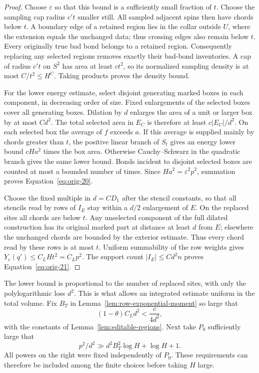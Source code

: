 \begin{proof}
Choose $\varepsilon$ so that this bound is a sufficiently small
fraction of $t$. Choose the sampling cap radius $c't$ smaller still.
All sampled adjacent spins then have chords below $t$. A boundary
edge of a retained region lies in the collar outside $U$, where the
extension equals the unchanged data; thus crossing edges also remain
below $t$. Every originally true bad bond belongs to a retained
region. Consequently replacing any selected regions removes exactly
their bad-bond inventories. A cap of radius $c't$ on $S^2$ has area
at least $ct^2$, so its normalized sampling density is at most
$C/t^2\le H^C$. Taking products proves the density bound.

For the lower energy estimate, select disjoint generating marked
boxes in each component, in decreasing order of size. Fixed
enlargements of the selected boxes cover all generating boxes.
Dilation by $d$ enlarges the area of a unit or larger box by at most
$Cd^2$. The total selected area in $E_C$ is therefore at least
$c|E_C|/d^2$. On each selected box the average of $f$ exceeds $a$.
If this average is supplied mainly by chords greater than $t$, the
positive linear branch of $S_t$ gives an energy lower bound
$cHa^2$ times the box area. Otherwise Cauchy--Schwarz in the quadratic
branch gives the same lower bound. Bonds incident to disjoint selected
boxes are counted at most a bounded number of times. Since
$Ha^2=\varepsilon^2p^2$, summation proves
Equation~\eqref{eq:orig-20}.

Choose the fixed multiple in $d=CD_1$ after the stencil constants, so
that all stencils read by rows of $I_E$ stay within a $d/2$ enlargement
of $E$. On the replaced sites all chords are below $t$. Any
unselected component of the full dilated construction has its
original marked part at distance at least $d$ from $E$; elsewhere
the unchanged chords are bounded by the exterior estimate. Thus
every chord read by these rows is at most $t$. Uniform summability of
the row weights gives $Y_e(q')\le C_LHt^2=C_Lp^2$.
The support count $|I_E|\le Cd^2n$ proves
Equation~\eqref{eq:orig-21}.
\end{proof}

The lower bound is proportional to the number of replaced sites,
with only the polylogarithmic loss $d^2$. This is what allows an
integrated estimate uniform in the total volume. Fix $B_T$ in
Lemma~\ref{lem:row-exponential-moment} so large that
\begin{equation}
 (1-\theta)C_Ld^2<\frac{c}{4d^2},
 \label{eq:comparison-theta-choice}
\end{equation}
with the constants of Lemma~\ref{lem:editable-regions}. Next take
$P_0$ sufficiently large that
\begin{equation}
 p^2/d^2\gg d^2B_T^2\log H+\log H+1.
 \label{eq:comparison-p-choice}
\end{equation}
All powers on the right were fixed independently of $P_0$. These
requirements can therefore be included among the finite choices
before taking $H$ large.

